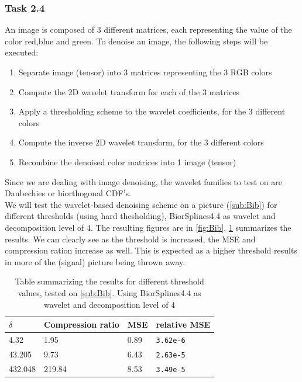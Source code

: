 \documentclass[a4paper]{article}
\begin{document}
    \subsubsection{Task 2.4}
	An image is composed of 3 different matrices, each representing the value of the color red,blue and green. To denoise an image, the following steps will be executed:
	\begin{enumerate}
		\item Separate image (tensor) into 3 matrices representing the 3 RGB colors
		\item Compute the 2D wavelet transform for each of the 3 matrices
		\item Apply a thresholding scheme to the wavelet coefficients, for the 3 different colors
		\item Compute the inverse 2D wavelet transform, for the 3 different colors
		\item Recombine the denoised color matrices into 1 image (tensor)
	\end{enumerate}
	Since we are dealing with image denoising, the wavelet families to test on are Daubechies or biorthogonal CDF's. \\

	We will test the wavelet-based denoising scheme on a picture (\cref{sub:Bib}) for different thresholds (using hard thesholding), BiorSplines4.4 as wavelet and decomposition level of 4. The resulting figures are in \cref{fig:Bib}, \cref{tab:bib} summarizes the results. We can clearly see as the threshold is increased, the MSE and compression ration increase as well. This is expected as a higher threshold results in more of the (signal) picture being thrown away.

\begin{table}[H]
	\centering
	\begin{tabular}{|l|l|l|l|}
	\hline
	$\delta$	& Compression ratio & MSE & relative MSE \\ \hline
	4.32	& 1.95 & 0.89 & \texttt{3.62e-6} \\ \hline
	43.205	& 9.73 & 6.43 & \texttt{2.63e-5} \\ \hline
	432.048	& 219.84 & 8.53 & \texttt{3.49e-5} \\ \hline
	\end{tabular}
	\caption{Table summarizing the results for different threshold values, tested on \cref{sub:Bib}. Using BiorSplines4.4 as wavelet and decomposition level of 4}
	\label{tab:bib}
\end{table}
\end{document}
